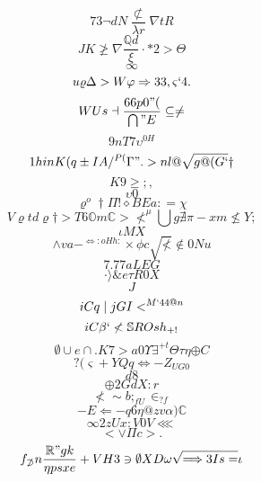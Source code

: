 \documentclass[12pt]{article}
\begin{document}
        \begin{minipage}[t][0pt]{\linewidth}

        \[73\neg d N\frac{\not\subset}{\lambda r}\nabla t R\]
\[JK\ngeq\nabla\frac{\mathbb{Q} d}{\xi}\cdot * 2 >\Theta\]
\[\infty\]
\[u\varrho\Delta > W\varphi\Rightarrow 3 3 , {\varsigma ` 4 .}\]
\[WUs\dashv\frac{66p0"(}{\bigcap " E}\subseteq\neq\]
\[9nT7\upsilon^{0H}\]
\[1hinK(q\pm I A /^{P(}\Gamma " . > n l @\sqrt{g@(G`}\dagger\]
\[K9\geq ; ,\]
\[\upsilon 0\]
\[\varrho^{o}\dagger\Pi !\diamond B E a : =\chi\]
\[V\varrho t d\varrho\dagger > T 6\mathbb{O} m\mathbb{C} >\nless^{\mu}\bigcup g\nexists\pi - x m\nleq Y ;\]
\[\iota M X\]
\[\land v a -^{\Leftrightarrow : o H h :}\times\phi c\sqrt{\nless}\notin 0 N u\]
\[7.77aLEG\]
\[\cdot\rangle\& e\tau R 0 X\]
\[J\]
\[iCq\mid j G I <^{M`44@n}\]
\[iC\beta `\nless\mathbb{S} R O s h_{+!}\]
\[\emptyset\cup {e}\cap . K 7 > a 0\Upsilon\exists^{+t}\Theta\tau\eta {\oplus C}\]
\[?(\varsigma + Y Q q\Leftrightarrow - Z_{UG0}\]
\[d8\]
\[\oplus 2 G d X : r\]
\[\nless\sim b ;_{fU}\in_{?f}\]
\[-E\Longleftarrow - q 6\eta @ z v\alpha )\mathbb{C}\]
\[\infty {2zUx:V0V}\lll\]
\[<\lor\Pi c > .\]
\[f_{\not\supset} n\frac{\mathbb{R} " g k}{\eta p s x e} + V H 3\ni\emptyset X D\omega\sqrt{\Longrightarrow 3 I s =}\iota
        \]
\end{minipage}
\end{document}
